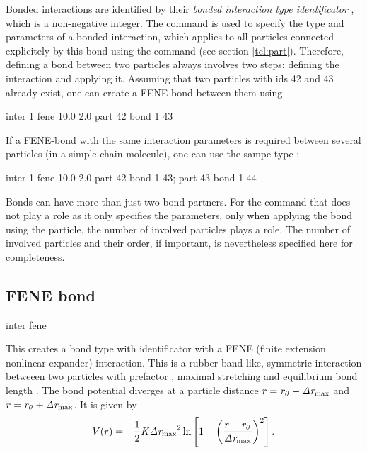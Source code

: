  Bonded interactions are identified
by their \emph{bonded interaction type identificator} ,
which is a non-negative integer.  The   command
is used to specify the type and parameters of a bonded interaction,
which applies to all particles connected explicitely by this bond
using the  command (see section \vref{tcl:part}).
Therefore, defining a bond between two particles always involves two
steps: defining the interaction and applying it. Assuming that two
particles with ids 42 and 43 already exist, one can create \eg a
FENE-bond between them using
\begin{tclcode}
  inter 1 fene 10.0 2.0
  part 42 bond 1 43
\end{tclcode}
If a FENE-bond with the same interaction parameters is required between several
particles (\eg in a simple chain molecule), one can use the sampe type :
\begin{tclcode}
  inter 1 fene 10.0 2.0
  part 42 bond 1 43; part 43 bond 1 44 
\end{tclcode}

Bonds can have more than just two bond partners. For the  command
that does not play a role as it only specifies the parameters, only when
applying the bond using the  particle, the number of involved
particles plays a role. The number of involved particles and their order, if
important, is nevertheless specified here for completeness.

\subsection{FENE bond}

\begin{essyntax}
  inter 
  fene
    
\end{essyntax}
This creates a bond type with identificator  with a
FENE (finite extension nonlinear expander) interaction. This is a
rubber-band-like, symmetric interaction betweeen two particles with
prefactor , maximal stretching  and
equilibrium bond length .  The bond potential diverges at a
particle distance $r=\mathrm{\mathit{r_0}}-\mathrm{\mathit{\Delta r_\mathrm{max}}}$ and
$r=\mathrm{\mathit{r_0}}+\mathrm{\mathit{\Delta r_\mathrm{max}}}$. It is given by
\begin{equation}
  V(r) = -\frac{1}{2} \mathrm{\mathit{K}} \mathrm{\mathit{\Delta r_\mathrm{max}}}^2\ln \left[ 1 - \left(
      \frac{r-\mathrm{\mathit{r_0}}}{\mathrm{\mathit{\Delta r_\mathrm{max}}}} \right)^2 \right].
\end{equation}

